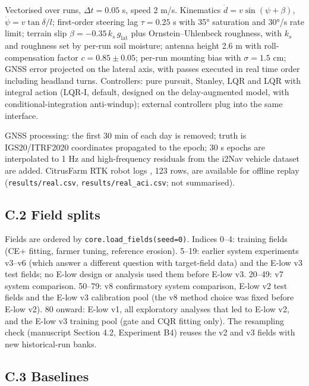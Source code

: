 \documentclass[preprint,12pt,authoryear]{elsarticle}
\begin{document}
Vectorised over runs, \(\Delta t=0.05\) s, speed 2 m/s. Kinematics \(\dot d=v\sin(\psi+\beta)\), \(\dot\psi=v\tan\delta/l\); first-order steering lag \(\tau=0.25\) s with 35° saturation and 30°/s rate limit; terrain slip \(\beta=-0.35\,k_s\,g_\mathrm{lat}\) plus Ornstein--Uhlenbeck roughness, with \(k_s\) and roughness set by per-run soil moisture; antenna height 2.6 m with roll-compensation factor \(c=0.85\pm0.05\); per-run mounting bias with \(\sigma=1.5\) cm; GNSS error projected on the lateral axis, with passes executed in real time order including headland turns. Controllers: pure pursuit, Stanley, LQR and LQR with integral action (LQR-I, default, designed on the delay-augmented model, with conditional-integration anti-windup); external controllers plug into the same interface.

GNSS processing: the first 30 min of each day is removed; truth is IGS20/ITRF2020 coordinates propagated to the epoch; 30 s epochs are interpolated to 1 Hz and high-frequency residuals from the i2Nav vehicle dataset \citep{tang2022} are added. CitrusFarm RTK robot logs \citep{teng2023}, 123 rows, are available for offline replay (\texttt{results/real.csv}, \texttt{results/real\_aci.csv}; not summarised).

\subsection*{C.2 Field splits}

Fields are ordered by \texttt{core.load\_fields(seed=0)}. Indices 0--4: training fields (CE+ fitting, farmer tuning, reference erosion). 5--19: earlier system experiments v3--v6 (which answer a different question with target-field data) and the E-low v3 test fields; no E-low design or analysis used them before E-low v3. 20--49: v7 system comparison. 50--79: v8 confirmatory system comparison, E-low v2 test fields and the E-low v3 calibration pool (the v8 method choice was fixed before E-low v2). 80 onward: E-low v1, all exploratory analyses that led to E-low v2, and the E-low v3 training pool (gate and CQR fitting only). The resampling check (manuscript Section 4.2, Experiment B4) reuses the v2 and v3 fields with new historical-run banks.

\subsection*{C.3 Baselines}
\end{document}
